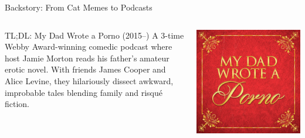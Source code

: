 \begin{frame}{Backstory: From Cat Memes to Podcasts}
\begin{columns}
    \begin{column}{0.8\textwidth}
        \begin{exampleblock}{TL;DL: My Dad Wrote a Porno (2015--)}
            A 3-time Webby Award-winning comedic podcast where host Jamie Morton reads his father's amateur erotic novel. With friends James Cooper and Alice Levine, they hilariously dissect awkward, improbable tales blending family and risqué fiction.
        \end{exampleblock}
    \end{column}
    \begin{column}{0.2\textwidth}
        \includegraphics[width=\textwidth]{../figures/my-dad-wrote-a-porno}
    \end{column}
\end{columns}


\end{frame}

